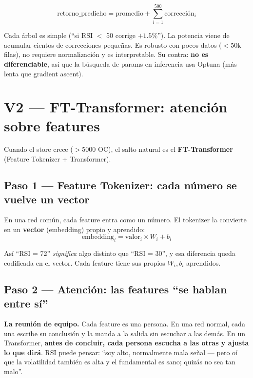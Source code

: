 \documentclass[11pt,a4paper]{article}
\begin{document}
\[
\text{retorno\_predicho} = \text{promedio} + \sum_{i=1}^{500} \text{corrección}_i
\]

Cada árbol es simple (``si RSI $<$ 50 corrige $+1.5\%$''). La potencia viene de acumular
cientos de correcciones pequeñas. Es robusto con pocos datos ($<$50k filas), no requiere
normalización y es interpretable. Su contra: \textbf{no es diferenciable}, así que la
búsqueda de params en inferencia usa Optuna (más lenta que gradient ascent).

\section{V2 — FT-Transformer: atención sobre features}

Cuando el store crece ($>$5000 OC), el salto natural es el \textbf{FT-Transformer}
(Feature Tokenizer + Transformer).

\subsection{Paso 1 — Feature Tokenizer: cada número se vuelve un vector}

En una red común, cada feature entra como un número. El tokenizer la convierte en un
\textbf{vector} (embedding) propio y aprendido:
\[
\text{embedding}_i = \text{valor}_i \times W_i + b_i
\]

\begin{center}
\end{center}

Así ``RSI = 72'' \emph{significa} algo distinto que ``RSI = 30'', y esa diferencia queda
codificada en el vector. Cada feature tiene sus propios $W_i, b_i$ aprendidos.

\subsection{Paso 2 — Atención: las features ``se hablan entre sí''}

\textbf{La reunión de equipo.} Cada feature es una persona. En una red normal, cada una escribe
su conclusión y la manda a la salida sin escuchar a las demás. En un Transformer, \textbf{antes
de concluir, cada persona escucha a las otras y ajusta lo que dirá}. RSI puede pensar: ``soy
alto, normalmente mala señal — pero oí que la volatilidad también es alta y el fundamental es
sano; quizás no sea tan malo''.
\end{document}
